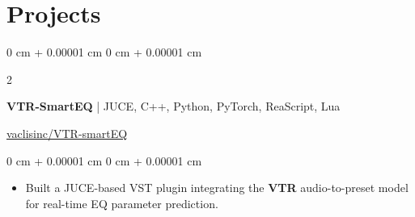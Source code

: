 \documentclass[10pt, letterpaper]{article}
\newenvironment{highlights}{
    \begin{itemize}[
        topsep=0.10 cm,
        parsep=0.10 cm,
        partopsep=0pt,
        itemsep=0pt,
        leftmargin=0 cm + 10pt
    ]
}{
    \end{itemize}
} %
\newenvironment{onecolentry}{
    \begin{adjustwidth}{
        0 cm + 0.00001 cm
    }{
        0 cm + 0.00001 cm
    }
}{
    \end{adjustwidth}
} %
\newenvironment{twocolentry}[2][]{
    \onecolentry
    \def\secondColumn{#2}
    \setcolumnwidth{\fill, 5.2 cm}
    \begin{paracol}{2}
}{
    \switchcolumn \raggedleft \secondColumn
    \end{paracol}
    \endonecolentry
} %
\begin{document}
    \section{Projects}




    \begin{twocolentry}{
        \href{https://github.com/vaclisinc/VTR-smartEQ}{vaclisinc/VTR-smartEQ}
    }
        \textbf{VTR-SmartEQ} | JUCE, C++, Python, PyTorch, ReaScript, Lua
    \end{twocolentry}
    
    \vspace{0.10 cm}
    \begin{onecolentry}
        \begin{highlights}
        \item Built a JUCE-based VST plugin integrating the \textbf{VTR} audio-to-preset model for real-time EQ parameter prediction.
        \end{highlights}
    \end{onecolentry}

    
\end{document}
